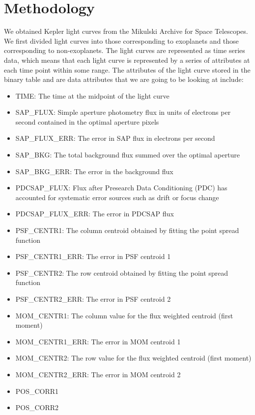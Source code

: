 \documentclass{amsart}
\begin{document}
\section{Methodology}
We obtained Kepler light curves from the Mikulski Archive for Space Telescopes. We first divided light curves into those corresponding to exoplanets and those corresponding to non-exoplanets. The light curves are represented as time series data, which means that each light curve is represented by a series of attributes at each time point within some range. The attributes of the light curve stored in the binary table and are data attributes that we are going to be looking at include:
\begin{itemize}
	\item TIME: The time at the midpoint of the light curve
	\item SAP\_FLUX: Simple aperture photometry flux in units of electrons per second contained in the optimal aperture pixels
	\item SAP\_FLUX\_ERR: The error in SAP flux in electrons per second
	\item SAP\_BKG: The total background flux summed over the optimal aperture
	\item SAP\_BKG\_ERR: The error in the background flux
	\item PDCSAP\_FLUX: Flux after Presearch Data Conditioning (PDC) has accounted for systematic error sources such as drift or focus change
	\item PDCSAP\_FLUX\_ERR: The error in PDCSAP flux
	\item PSF\_CENTR1: The column centroid obtained by fitting the point spread function
	\item PSF\_CENTR1\_ERR: The error in PSF centroid 1
	\item PSF\_CENTR2: The row centroid obtained by fitting the point spread function
	\item PSF\_CENTR2\_ERR: The error in PSF centroid 2
	\item MOM\_CENTR1: The column value for the flux weighted centroid (first moment)
	\item MOM\_CENTR1\_ERR: The error in MOM centroid 1
	\item MOM\_CENTR2: The row value for the flux weighted centroid (first moment)
	\item MOM\_CENTR2\_ERR: The error in MOM centroid 2
	\item POS\_CORR1
	\item POS\_CORR2
\end{itemize}
\end{document}
